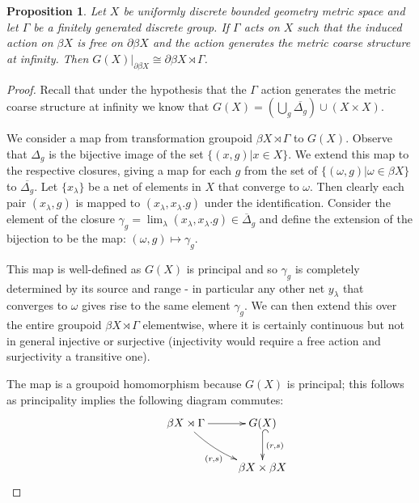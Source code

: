 \documentclass[11pt]{amsart}
\theoremstyle{plain}
\newtheorem{proposition}[theorem]{Proposition}%
\theoremstyle{definition}%
\theoremstyle{remark}%
\begin{document}
\begin{proposition}\label{Prop:Crit}
Let $X$ be uniformly discrete bounded geometry metric space and let $\Gamma$ be a finitely generated discrete group. If $\Gamma$ acts on $X$ such that the induced action on $\beta X$ is free on $\partial \beta X$ and the action generates the metric coarse structure at infinity. Then $G(X)|_{\partial \beta X} \cong \partial \beta X \rtimes \Gamma$.
\end{proposition}
\begin{proof}
Recall that under the hypothesis that the $\Gamma$ action generates the metric coarse structure at infinity we know that $G(X) = (\bigcup_{g} \overline{\Delta_{g}})\cup (X \times X)$.

We consider a map from transformation groupoid $\beta X \rtimes \Gamma$ to $G(X)$. Observe that $\Delta_{g}$ is the bijective image of the set $\lbrace (x,g)|x \in X \rbrace$. We extend this map to the respective closures, giving a map for each $g$ from the set of $\lbrace (\omega,g) | \omega \in \beta X \rbrace$ to $\overline{\Delta_{g}}$. Let $\lbrace x_{\lambda} \rbrace$ be a net of elements in $X$ that converge to $\omega$. Then clearly each pair $(x_{\lambda},g)$ is mapped to $(x_{\lambda},x_{\lambda}.g)$ under the identification. Consider the element of the closure $\gamma_{g}= \lim_{\lambda}(x_{\lambda},x_{\lambda}.g) \in \overline \Delta_{g}$ and define the extension of the bijection to be the map: $(\omega,g) \mapsto \gamma_{g}$.

This map is well-defined as $G(X)$ is principal and so $\gamma_{g}$ is completely determined by its source and range - in particular any other net $y_{\lambda}$ that converges to $\omega$ gives rise to the same element $\gamma_{g}$. We can then extend this over the entire groupoid $\beta X \rtimes \Gamma$ elementwise, where it is certainly continuous but not in general injective or surjective (injectivity would require a free action and surjectivity a transitive one). 

The map is a groupoid homomorphism because $G(X)$ is principal; this follows as principality implies the following diagram commutes:
\begin{equation*}
\xymatrix{
& \beta X \rtimes \Gamma \ar@/_/[rd]_{(r,s)} \ar[r] & G(X) \ar@{^{(}->}[d]^{(r,s)}\\ & & \beta X \times \beta X
}
\end{equation*}


\end{proof}
\end{document}
